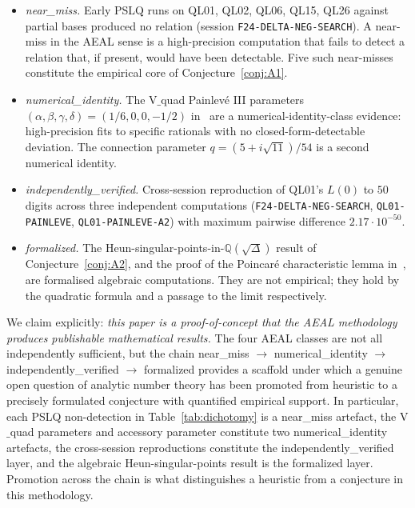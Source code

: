 \documentclass[12pt]{amsart}
\theoremstyle{definition}
\begin{document}
\begin{itemize}
\item \emph{near\_miss.} Early PSLQ runs on QL01, QL02, QL06, QL15, QL26
against partial bases produced no relation (session
\texttt{F24-DELTA-NEG-SEARCH}). A near-miss in the AEAL sense is a
high-precision computation that fails to detect a relation that, if
present, would have been detectable. Five such near-misses constitute the
empirical core of Conjecture~\ref{conj:A1}.
\item \emph{numerical\_identity.} The V$\_$quad Painlev\'e III parameters
$(\alpha,\beta,\gamma,\delta)=(1/6,0,0,-1/2)$
in~\cite{Papanokechi2026Vquad} are a numerical-identity-class evidence:
high-precision fits to specific rationals with no closed-form-detectable
deviation. The connection parameter
$q=(5+i\sqrt{11})/54$ is a second numerical identity.
\item \emph{independently\_verified.} Cross-session reproduction of QL01's
$L(0)$ to $50$ digits across three independent computations
(\texttt{F24-DELTA-NEG-SEARCH}, \texttt{QL01-PAINLEVE},
\texttt{QL01-PAINLEVE-A2}) with maximum pairwise difference
$2.17\cdot 10^{-50}$.
\item \emph{formalized.} The Heun-singular-points-in-$\mathbb{Q}(\sqrt{\Delta})$
result of Conjecture~\ref{conj:A2}, and the proof of the Poincar\'e
characteristic lemma in~\cite{Papanokechi2026Spec}, are
formalised algebraic computations. They are not empirical; they hold by
the quadratic formula and a passage to the limit respectively.
\end{itemize}

We claim explicitly: \emph{this paper is a proof-of-concept that the AEAL
methodology produces publishable mathematical results.} The four AEAL
classes are not all independently sufficient, but the chain
near\_miss $\to$ numerical\_identity $\to$ independently\_verified $\to$
formalized provides a scaffold under which a genuine open question of
analytic number theory has been promoted from heuristic to a precisely
formulated conjecture with quantified empirical support. In particular,
each PSLQ non-detection in Table~\ref{tab:dichotomy} is a near\_miss
artefact, the V$\_$quad parameters and accessory parameter constitute
two numerical\_identity artefacts, the cross-session reproductions
constitute the independently\_verified layer, and the algebraic
Heun-singular-points result is the formalized layer. Promotion across
the chain is what distinguishes a heuristic from a conjecture in this
methodology.
\end{document}
